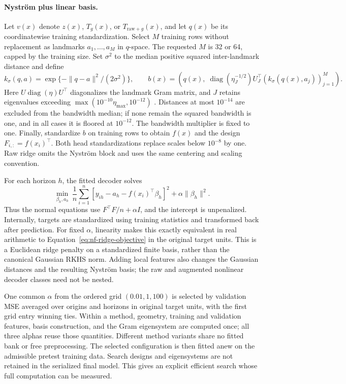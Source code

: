 \paragraph{Nystr\"om plus linear basis.}
\label{sec:nf-head}
Let $v(x)$ denote $z(x)$, $T_g(x)$, or $T_{\mathrm{raw}+g}(x)$, and let
$q(x)$ be its coordinatewise training standardization.  Select $M$ training
rows without replacement as landmarks $a_1,\ldots,a_M$ in $q$-space.
The requested $M$ is 32 or 64, capped by the training size.
Set $\sigma^2$ to the median positive squared inter-landmark distance and
define
\begin{equation}
 k_\sigma(q,a)=\exp\{-\|q-a\|^2/(2\sigma^2)\},\qquad
 b(x)=\left(q(x),\;
       \operatorname{diag}(\eta_J^{-1/2})U_J^\top
                  (k_\sigma(q(x),a_j))_{j=1}^M\right).
 \label{eq:nf-nystrom}
\end{equation}
Here $U\operatorname{diag}(\eta)U^\top$ diagonalizes the landmark Gram
matrix, and $J$ retains eigenvalues exceeding
$\max(10^{-10}\eta_{\max},10^{-12})$ \citep{Williams2001Nystrom}.
Distances at most $10^{-14}$ are excluded from the bandwidth median;
if none remain the squared bandwidth is one, and in all cases it is floored
at $10^{-12}$.  The bandwidth multiplier is fixed to one.
Finally, standardize $b$ on training rows to obtain $f(x)$ and the design
$F_{i,:}=f(x_i)^\top$.  Both head standardizations replace scales below
$10^{-8}$ by one.  Raw ridge omits the Nystr\"om block and uses the same
centering and scaling convention.

For each horizon $h$, the fitted decoder solves
\begin{equation}
 \min_{\beta_h,a_h}\ \frac1n\sum_{i=1}^n
       [y_{ih}-a_h-f(x_i)^\top\beta_h]^2+\alpha\|\beta_h\|^2.
 \label{eq:nf-ridge-objective}
\end{equation}
Thus the normal equations use $F^\top F/n+\alpha I$, and the intercept is
unpenalized.  Internally, targets are standardized using training statistics
and transformed back after prediction.  For fixed $\alpha$, linearity makes
this exactly equivalent in real arithmetic to
Equation~\eqref{eq:nf-ridge-objective} in the original target units.
This is a Euclidean ridge penalty on a standardized finite basis, rather
than the canonical Gaussian RKHS norm.  Adding local features also changes
the Gaussian distances and the resulting Nystr\"om basis; the raw and
augmented nonlinear decoder classes need not be nested.

One common $\alpha$ from the ordered grid $(0.01,1,100)$ is selected by validation MSE averaged
over origins and horizons in original target units, with the first grid
entry winning ties.  Within a method, geometry, training and validation
features, basis construction, and the Gram eigensystem are computed once;
all three alphas reuse those quantities.  Different method variants share
no fitted bank or free preprocessing.  The selected configuration is then
fitted anew on the admissible pretest training data.  Search designs and
eigensystems are not retained in the serialized final model.  This gives
an explicit efficient search whose full computation can be measured.


